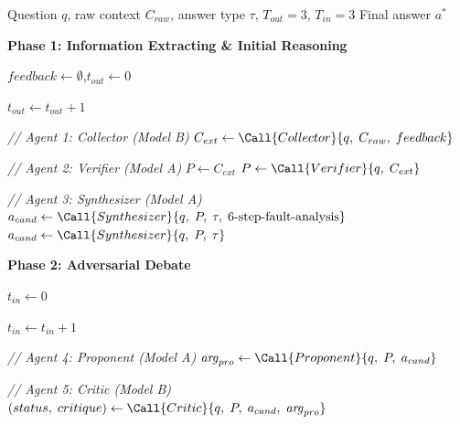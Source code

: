 
\begin{algorithm*}[t]
\caption{NetAgent: Multi-Agent Debate for Network Configuration QA}
\label{alg:netagent}
\begin{algorithmic}[1]

\Require Question $q$, raw context $C_{raw}$, answer type $\tau$,
         $T_{out}{=}3$, $T_{in}{=}3$
\Ensure Final answer $a^*$

\Statex \hrulefill
\Statex \textbf{Phase 1: Information Extracting \& Initial Reasoning}
\Statex \hrulefill

\State $feedback \leftarrow \emptyset$,\quad $t_{out} \leftarrow 0$

\Repeat \hfill{}
    \State $t_{out} \leftarrow t_{out} + 1$

    \State \textit{// Agent 1: Collector (Model B)}
    \State $C_{ext} \leftarrow \Call{Collector}{q,\; C_{raw},\; feedback}$
    \hfill{}

    \State \textit{// Agent 2: Verifier (Model A)}
        \State $P \leftarrow C_{ext}$
        \hfill{}
    \Else
        \State $P \leftarrow \Call{Verifier}{q,\; C_{ext}}$
        \hfill{}
    \EndIf

    \State \textit{// Agent 3: Synthesizer (Model A)}
        \State $a_{cand} \leftarrow \Call{Synthesizer}{q,\; P,\; \tau,\;\text{6-step-fault-analysis}}$
    \Else
        \State $a_{cand} \leftarrow \Call{Synthesizer}{q,\; P,\; \tau}$
    \EndIf

\Statex \hrulefill
\Statex \quad\textbf{Phase 2: Adversarial Debate}
\Statex \hrulefill

    \State $t_{in} \leftarrow 0$

    \Repeat \hfill{}
        \State $t_{in} \leftarrow t_{in} + 1$

        \State \textit{// Agent 4: Proponent (Model A)}
        \State $\mathit{arg}_{pro} \leftarrow \Call{Proponent}{q,\; P,\; a_{cand}}$
        \hfill{}

        \State \textit{// Agent 5: Critic (Model B)}
        \State $(status,\; critique) \leftarrow \Call{Critic}{q,\; P,\; a_{cand},\; \mathit{arg}_{pro}}$


\end{algorithmic}
\end{algorithm*}
